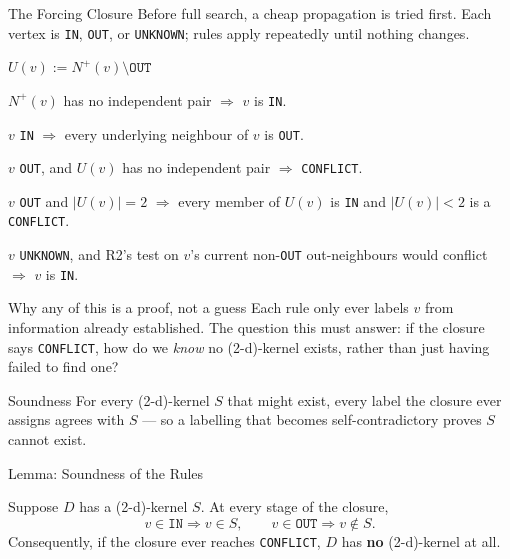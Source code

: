 \documentclass[11pt]{beamer}
\begin{document}
\begin{frame}{The Forcing Closure}
  Before full search, a cheap propagation is tried first. Each vertex is
  \texttt{IN}, \texttt{OUT}, or \texttt{UNKNOWN}; rules apply repeatedly until
  nothing changes.

  \smallskip
  $U(v) := N^+(v) \setminus \texttt{OUT}$

  \medskip
  \begin{description}[leftmargin=1.6cm,style=nextline]
    \item[R0] $N^+(v)$ has no independent pair $\Rightarrow$ $v$ is \texttt{IN}.
    \item[R1] $v$ \texttt{IN} $\Rightarrow$ every underlying neighbour of $v$ is
          \texttt{OUT}.
    \item[R2] $v$ \texttt{OUT}, and $U(v)$ has no independent pair $\Rightarrow$ \texttt{CONFLICT}.
    \item[R3] $v$ \texttt{OUT} and $|U(v)| = 2$ $\Rightarrow$ every member of
          $U(v)$ is \texttt{IN} and $|U(v)| < 2$ is a \texttt{CONFLICT}.
    \item[R4] $v$ \texttt{UNKNOWN}, and R2's test on $v$'s current
          non-\texttt{OUT} out-neighbours would conflict $\Rightarrow$ $v$ is
          \texttt{IN}.
  \end{description}
\end{frame}

\begin{frame}{Why any of this is a proof, not a guess}
  Each rule only ever labels $v$ from information already established. The
  question this must answer: if the closure says \texttt{CONFLICT}, how do we
  \emph{know} no (2-d)-kernel exists, rather than just having failed to find
  one?

  \smallskip
  \begin{block}{Soundness}
    For every (2-d)-kernel $S$ that might exist, every label the closure ever
    assigns agrees with $S$ --- so a labelling that becomes self-contradictory
    proves $S$ cannot exist.
  \end{block}
\end{frame}

\begin{frame}{Lemma: Soundness of the Rules}
  \begin{lemma}[Soundness]
    Suppose $D$ has a (2-d)-kernel $S$. At every stage of the closure,
    \[
      v\in\texttt{IN}\Rightarrow v\in S,
      \qquad
      v\in\texttt{OUT}\Rightarrow v\notin S.
    \]
    Consequently, if the closure ever reaches \texttt{CONFLICT}, $D$ has
    \textbf{no} (2-d)-kernel at all.
  \end{lemma}
\end{frame}
\end{document}
